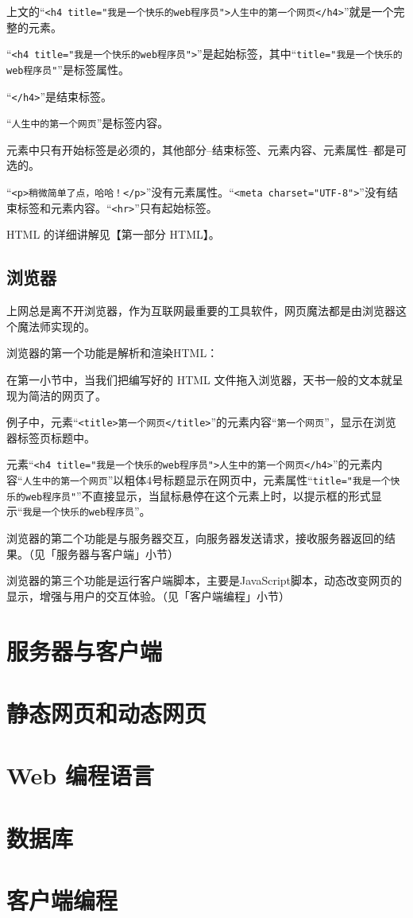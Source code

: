 上文的“\verb|<h4 title="我是一个快乐的web程序员">人生中的第一个网页</h4>|”就是一个完整的元素。

“\verb|<h4 title="我是一个快乐的web程序员">|”是起始标签，其中“\verb|title="我是一个快乐的web程序员"|”是标签属性。

“\verb|</h4>|”是结束标签。

“\verb|人生中的第一个网页|”是标签内容。

元素中只有开始标签是必须的，其他部分--结束标签、元素内容、元素属性--都是可选的。

“\verb|<p>稍微简单了点，哈哈！</p>|”没有元素属性。“\verb|<meta charset="UTF-8">|”没有结束标签和元素内容。“\verb|<hr>|”只有起始标签。

HTML 的详细讲解见【第一部分 HTML】。

\subsection{浏览器}

上网总是离不开浏览器，作为互联网最重要的工具软件，网页魔法都是由浏览器这个魔法师实现的。

浏览器的第一个功能是解析和渲染HTML：

在第一小节中，当我们把编写好的 HTML 文件拖入浏览器，天书一般的文本就呈现为简洁的网页了。

例子中，元素“\verb|<title>第一个网页</title>|”的元素内容“\verb|第一个网页|”，显示在浏览器标签页标题中。

元素“\verb|<h4 title="我是一个快乐的web程序员">人生中的第一个网页</h4>|”的元素内容“\verb|人生中的第一个网页|”以粗体4号标题显示在网页中，元素属性“\verb|title="我是一个快乐的web程序员"|”不直接显示，当鼠标悬停在这个元素上时，以提示框的形式显示“\verb|我是一个快乐的web程序员|”。

浏览器的第二个功能是与服务器交互，向服务器发送请求，接收服务器返回的结果。（见「服务器与客户端」小节）

浏览器的第三个功能是运行客户端脚本，主要是JavaScript脚本，动态改变网页的显示，增强与用户的交互体验。（见「客户端编程」小节）

\section{服务器与客户端}



\section{静态网页和动态网页}

\section{Web 编程语言}

\section{数据库}

\section{客户端编程}